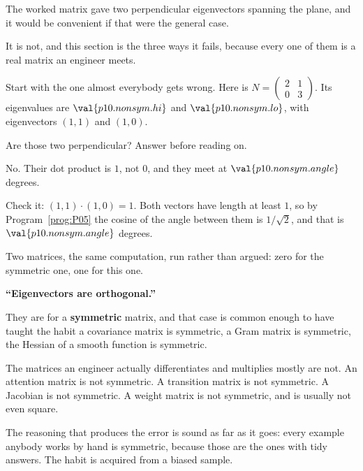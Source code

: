\begin{fr}
The worked matrix gave two perpendicular eigenvectors spanning the plane, and
it would be convenient if that were the general case.

It is not, and this section is the three ways it fails, because every one of
them is a real matrix an engineer meets.

Start with the one almost everybody gets wrong. Here is
$N = \begin{pmatrix} 2 & 1 \\ 0 & 3 \end{pmatrix}$. Its eigenvalues are
$\val{p10.nonsym.hi}$ and $\val{p10.nonsym.lo}$, with eigenvectors $(1, 1)$ and
$(1, 0)$.

Are those two perpendicular? Answer before reading on.
\dotline
\nextframe
\end{fr}

\begin{fr}
\begin{ansblock}
No. Their dot product is $1$, not $0$, and they meet at
$\val{p10.nonsym.angle}$ degrees.
\end{ansblock}

Check it: $(1,1) \cdot (1,0) = 1$. Both vectors have length at least $1$, so by
Program~\ref{prog:P05} the cosine of the angle between them is
$1/\sqrt{2}$, and that is $\val{p10.nonsym.angle}$ degrees.


Two matrices, the same computation, run rather than argued: zero for the
symmetric one, one for this one.
\end{fr}

\begin{trapbox}
\textbf{\enquote{Eigenvectors are orthogonal.}}

They are for a \textbf{symmetric} matrix, and that case is common enough to
have taught the habit \dash{} a covariance matrix is symmetric, a Gram matrix
is symmetric, the Hessian of a smooth function is symmetric.

The matrices an engineer actually differentiates and multiplies mostly are not.
An attention matrix is not symmetric. A transition matrix is not symmetric. A
Jacobian is not symmetric. A weight matrix is not symmetric, and is usually not
even square.

The reasoning that produces the error is sound as far as it goes: every
example anybody works by hand is symmetric, because those are the ones with
tidy answers. The habit is acquired from a biased sample.
\end{trapbox}

